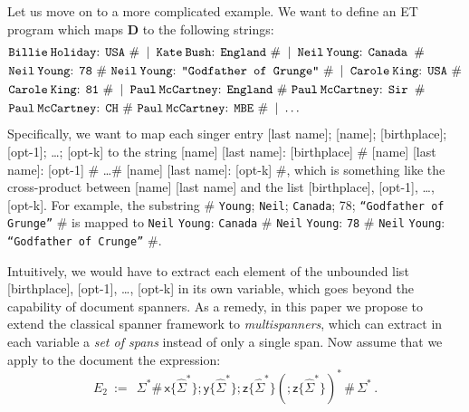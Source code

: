 \documentclass[
a4paper
]{article}
\theoremstyle{plain}
\theoremstyle{definition}
\theoremstyle{remark}
\newcommand{\secondExampleEx}{E_2}
\newcommand{\doc}{\ensuremath{\mathbf{D}}}
\newcommand{\varsx}{\ensuremath{\textsf{x}}}
\newcommand{\varsy}{\ensuremath{\textsf{y}}}
\newcommand{\varsz}{\ensuremath{\textsf{z}}}
\begin{document}
Let us move on to a more complicated example. We want to define an ET program which maps $\doc$ to the following strings:
\begin{align*}
&\scalebox{1}{\texttt{Billie}\:\texttt{Holiday}: \texttt{USA} \# \hspace{2pt}\textbar \hspace{2pt} \texttt{Kate}\:\texttt{Bush}: \texttt{England} \# \hspace{2pt}\textbar\hspace{2pt} \texttt{Neil}\:\texttt{Young}: \texttt{Canada} \hspace{2pt}\#}\\
&\scalebox{1}{\texttt{Neil}\:\texttt{Young}: \texttt{78} \# \texttt{Neil}\:\texttt{Young}: \texttt{``Godfather of Grunge''} \# \hspace{2pt}\textbar\hspace{2pt} \texttt{Carole}\:\texttt{King}: \texttt{USA} \#}\\
& \scalebox{1}{\texttt{Carole}\:\texttt{King}: \texttt{81} \# \hspace{2pt}\textbar \hspace{2pt} \texttt{Paul}\:\texttt{McCartney}: \texttt{England} \# \texttt{Paul}\:\texttt{McCartney}: \texttt{Sir} \hspace{2pt}\#}\\
&\scalebox{1}{\texttt{Paul}\:\texttt{McCartney}: \texttt{CH} \# \texttt{Paul}\:\texttt{McCartney}: \texttt{MBE} \# \hspace{2pt}\textbar  \hspace{2pt} \ldots}
\end{align*}
Specifically, we want to 
map each singer entry [last name]; [name]; [birthplace]; [opt-1]; \dots; [opt-k] to the string [name] [last name]: [birthplace] \# [name] [last name]: [opt-1] \# \ldots \# [name] [last name]: [opt-k] \#,
which is something like the cross-product between [name] [last name] and the list [birthplace], [opt-1], \dots, [opt-k]. For example, the substring \# \texttt{Young}; \texttt{Neil}; \texttt{Canada}; 78; \texttt{``Godfather of Grunge''} \# is mapped to 
\texttt{Neil} \texttt{Young}: \texttt{Canada} \# \texttt{Neil} \texttt{Young}: \texttt{78} \# \texttt{Neil} \texttt{Young}: \texttt{``Godfather of Crunge''} \#.

Intuitively, we would have to extract each element of the unbounded list [birthplace], [opt-1], \dots, [opt-k] in its own variable, which goes beyond the capability of document spanners.
As a remedy,
in this paper we propose to extend the classical spanner framework to \emph{multispanners}, which can extract in each variable a \emph{set of spans} instead of only a single span. Now assume that we apply to the document the expression:
\[
	\secondExampleEx \ := \ \ \Sigma^* \# \, \varsx\{\widehat{\Sigma}^*\}; \varsy\{\widehat{\Sigma}^*\} ; \varsz\{ \widehat{\Sigma}^* \} (; \varsz\{ \widehat{\Sigma}^* \})^*\, \#\, \Sigma^*\,.
\]
\end{document}
